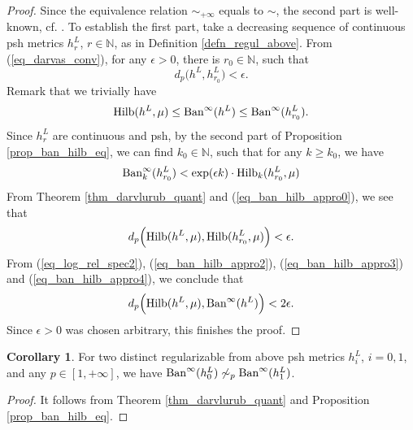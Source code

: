 \documentclass[12pt]{article}
\numberwithin{equation}{section}
\theoremstyle{theorem}
\theoremstyle{definition}
\newtheorem{cor}[thm]{Corollary}
\theoremstyle{remark}
\newcommand{\nat}{\mathbb{N}}
\begin{document}
	\begin{proof}
		Since the equivalence relation $\sim_{+ \infty}$ equals to $\sim$, the second part is well-known, cf. \cite[Proposition 2.10]{FinSecRing}.
		To establish the first part, take a decreasing sequence of continuous psh metrics $h^{L}_r$, $r \in \nat$,  as in Definition \ref{defn_regul_above}.
		From (\ref{eq_darvas_conv}), for any $\epsilon > 0$, there is $r_0 \in \nat$, such that
		\begin{equation}\label{eq_ban_hilb_appro0}
			d_p \big( h^L, h^{L}_{r_0} \big)  < \epsilon.
		\end{equation}	
		Remark that we trivially have
		\begin{equation}\label{eq_ban_hilb_appro2}
			{\rm{Hilb}}(h^L, \mu) \leq {\rm{Ban}}^{\infty}(h^L) \leq {\rm{Ban}}^{\infty}(h^{L}_{r_0}).
		\end{equation}
		Since $h^{L}_r$ are continuous and psh, by the second part of Proposition \ref{prop_ban_hilb_eq}, we can find $k_0 \in \nat$, such that for any $k \geq k_0$, we have
		\begin{equation}\label{eq_ban_hilb_appro3}
			{\rm{Ban}}^{\infty}_k(h^{L}_{r_0}) < \exp(\epsilon k) \cdot {\rm{Hilb}}_k(h^{L}_{r_0}, \mu)
		\end{equation}
		From Theorem \ref{thm_darvlurub_quant} and (\ref{eq_ban_hilb_appro0}), we see that
		\begin{equation}\label{eq_ban_hilb_appro4}
			d_p \Big( {\rm{Hilb}}(h^L, \mu), {\rm{Hilb}}(h^{L}_{r_0}, \mu) \Big)  < \epsilon.
		\end{equation}
		From (\ref{eq_log_rel_spec2}), (\ref{eq_ban_hilb_appro2}), (\ref{eq_ban_hilb_appro3}) and (\ref{eq_ban_hilb_appro4}), we conclude that 
		\begin{equation}
			d_p \Big( {\rm{Hilb}}(h^L, \mu), {\rm{Ban}}^{\infty}(h^L) \Big) < 2 \epsilon.
		\end{equation}
		Since $\epsilon > 0$ was chosen arbitrary, this finishes the proof.
	\end{proof}
	
	\begin{cor}\label{cor_baninf_dist}
		For two distinct regularizable from above psh metrics $h^L_i$, $i = 0, 1$, and any $p \in [1, + \infty]$, we have ${\rm{Ban}}^{\infty}(h^L_0) \not\sim_p {\rm{Ban}}^{\infty}(h^L_1)$.
	\end{cor}
	\begin{proof}
		It follows from Theorem \ref{thm_darvlurub_quant} and Proposition \ref{prop_ban_hilb_eq}.
	\end{proof}	
	
\end{document}
